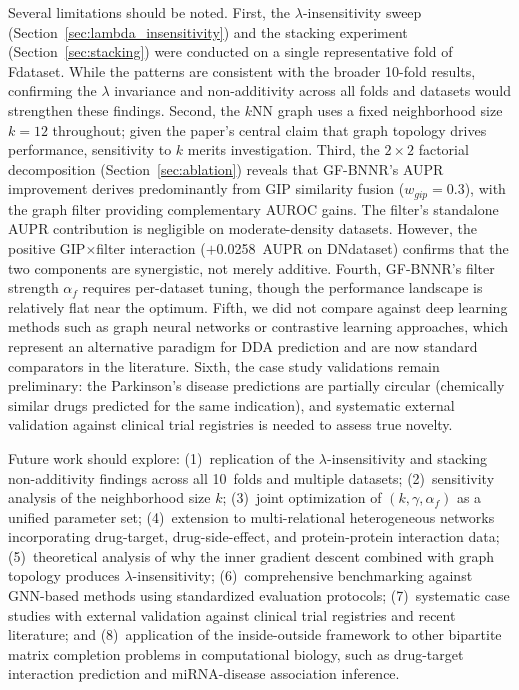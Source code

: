 \documentclass[unnumsec,webpdf,contemporary,large]{oup-authoring-template}
\begin{document}
Several limitations should be noted. First, the $\lambda$-insensitivity sweep (Section~\ref{sec:lambda_insensitivity}) and the stacking experiment (Section~\ref{sec:stacking}) were conducted on a single representative fold of Fdataset. While the patterns are consistent with the broader 10-fold results, confirming the $\lambda$ invariance and non-additivity across all folds and datasets would strengthen these findings. Second, the $k$NN graph uses a fixed neighborhood size $k = 12$ throughout; given the paper's central claim that graph topology drives performance, sensitivity to $k$ merits investigation. Third, the $2\times2$ factorial decomposition (Section~\ref{sec:ablation}) reveals that GF-BNNR's AUPR improvement derives predominantly from GIP similarity fusion ($w_{gip}=0.3$), with the graph filter providing complementary AUROC gains. The filter's standalone AUPR contribution is negligible on moderate-density datasets. However, the positive GIP$\times$filter interaction ($+$0.0258~AUPR on DNdataset) confirms that the two components are synergistic, not merely additive. Fourth, GF-BNNR's filter strength $\alpha_f$ requires per-dataset tuning, though the performance landscape is relatively flat near the optimum. Fifth, we did not compare against deep learning methods such as graph neural networks \citep{gao2023} or contrastive learning approaches, which represent an alternative paradigm for DDA prediction and are now standard comparators in the literature. Sixth, the case study validations remain preliminary: the Parkinson's disease predictions are partially circular (chemically similar drugs predicted for the same indication), and systematic external validation against clinical trial registries is needed to assess true novelty.

Future work should explore: (1)~replication of the $\lambda$-insensitivity and stacking non-additivity findings across all 10~folds and multiple datasets; (2)~sensitivity analysis of the neighborhood size $k$; (3)~joint optimization of $(k, \gamma, \alpha_f)$ as a unified parameter set; (4)~extension to multi-relational heterogeneous networks incorporating drug-target, drug-side-effect, and protein-protein interaction data; (5)~theoretical analysis of why the inner gradient descent combined with graph topology produces $\lambda$-insensitivity; (6)~comprehensive benchmarking against GNN-based methods using standardized evaluation protocols; (7)~systematic case studies with external validation against clinical trial registries and recent literature; and (8)~application of the inside-outside framework to other bipartite matrix completion problems in computational biology, such as drug-target interaction prediction and miRNA-disease association inference.
\end{document}
